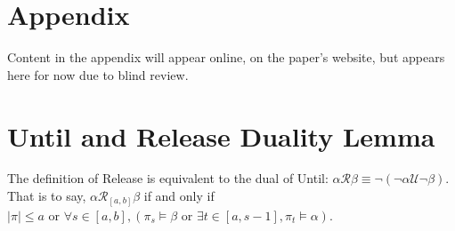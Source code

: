 \documentclass[runningheads]{llncs}
\begin{document}
\section*{Appendix} \label{Appendix}
\renewcommand{\thesection}{\Roman{section}}
Content in the appendix will appear online, on the paper's website, but appears here for now due to blind review.
 
 \section{Until and Release Duality Lemma} \label{duality appendix}
 \begin{lemma}\label{dual_proof}
 The definition of Release is equivalent to the dual of Until: 
 $\alpha \mathcal{R} \beta \equiv \neg (\neg \alpha \mathcal{U} \neg \beta)$. That is to say,
$\alpha \mathcal{R}_{[a,b]} \beta$ if and only if $|\pi| \le a \text{ or } \forall s \in [a,b] ,(\pi_s \vDash \beta \text{ or } \exists t \in [a, s-1] , \pi_t \vDash \alpha)$.
 \end{lemma}
 
\end{document}
